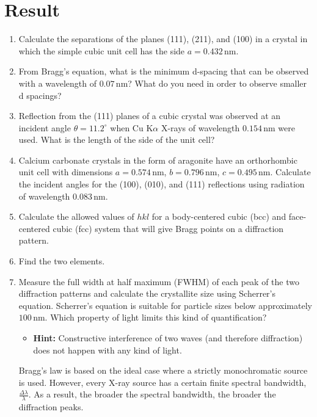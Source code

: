 \section{Result}

\begin{enumerate}
    \item Calculate the separations of the planes (111), (211), and (100) in a crystal in which the simple cubic unit cell has the side \( a = 0.432 \, \text{nm} \).
    \item From Bragg’s equation, what is the minimum d-spacing that can be observed with a wavelength of \( 0.07 \, \text{nm} \)? What do you need in order to observe smaller d spacings?
    \item Reflection from the (111) planes of a cubic crystal was observed at an incident angle \( \theta = 11.2^\circ \) when Cu K\(\alpha\) X-rays of wavelength \( 0.154 \, \text{nm} \) were used. What is the length of the side of the unit cell?
    \item Calcium carbonate crystals in the form of aragonite have an orthorhombic unit cell with dimensions \( a = 0.574 \, \text{nm} \), \( b = 0.796 \, \text{nm} \), \( c = 0.495 \, \text{nm} \). Calculate the incident angles for the (100), (010), and (111) reflections using radiation of wavelength \( 0.083 \, \text{nm} \).
    \item Calculate the allowed values of \( hkl \) for a body-centered cubic (bcc) and face-centered cubic (fcc) system that will give Bragg points on a diffraction pattern.
    \item Find the two elements.
    \item Measure the full width at half maximum (FWHM) of each peak of the two diffraction patterns and calculate the crystallite size using Scherrer’s equation. Scherrer’s equation is suitable for particle sizes below approximately \( 100 \, \text{nm} \). Which property of light limits this kind of quantification? 
    \begin{itemize}
        \item \textbf{Hint:} Constructive interference of two waves (and therefore diffraction) does not happen with any kind of light.
    \end{itemize}
    Bragg’s law is based on the ideal case where a strictly monochromatic source is used. However, every X-ray source has a certain finite spectral bandwidth, \( \frac{\Delta \lambda}{\lambda} \). As a result, the broader the spectral bandwidth, the broader the diffraction peaks.
    

\end{enumerate}
